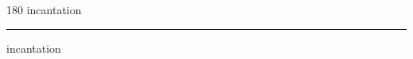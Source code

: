 
\begin{frame}
\begin{center}
\begin{turn}{180}
{\fontsize{2.5cm}{1em}\selectfont incantation}
\end{turn}
\vspace{1em}\par  
\hrule
\vspace{1em}\par  
{\fontsize{2.5cm}{1em}\selectfont incantation}
\end{center}
\end{frame}
